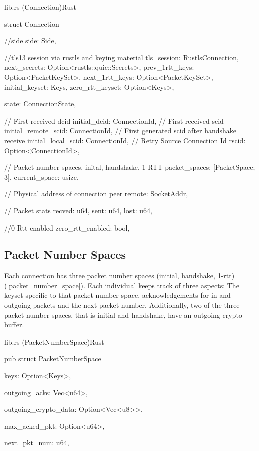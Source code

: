 \begin{codeblock}{lib.rs (Connection)}{Rust}
  \begin{rustcode}
    struct Connection {
        //side
        side: Side,
    
        //tls13 session via rustls and keying material
        tls_session: RustlsConnection,
        next_secrets: Option<rustls::quic::Secrets>,
        prev_1rtt_keys: Option<PacketKeySet>,
        next_1rtt_keys: Option<PacketKeySet>,
        initial_keyset: Keys,
        zero_rtt_keyset: Option<Keys>,
    
        state: ConnectionState,
    
        // First received dcid
        initial_dcid: ConnectionId,
        // First received scid
        initial_remote_scid: ConnectionId,
        // First generated scid after handshake receive
        initial_local_scid: ConnectionId,
        // Retry Source Connection Id
        rscid: Option<ConnectionId>,
    
        // Packet number spaces, inital, handshake, 1-RTT
        packet_spaces: [PacketSpace; 3],
        current_space: usize,
    
        // Physical address of connection peer
        remote: SocketAddr,
    
        // Packet stats
        recved: u64,
        sent: u64,
        lost: u64,
    
        //0-Rtt enabled
        zero_rtt_enabled: bool,
    }
  \end{rustcode}
\end{codeblock}

\subsection{Packet Number Spaces}

Each connection has three packet number spaces (initial, handshake, 1-rtt)(\ref{packet_number_space}). Each individual 
keeps track of three aspects: The keyset specific to that packet number space, acknowledgements for in and outgoing packets and the next packet
number. Additionally, two of the three packet number spaces, that is initial and handshake, have an outgoing crypto buffer. 

\begin{codeblock}{lib.rs (PacketNumberSpace)}{Rust}
  \begin{rustcode}
    pub struct PacketNumberSpace {
        keys: Option<Keys>,
    
        outgoing_acks: Vec<u64>,
    
        outgoing_crypto_data: Option<Vec<u8>>,
    
        max_acked_pkt: Option<u64>,
    
        next_pkt_num: u64,
    }
  \end{rustcode}
  \label{packet_number_space}
\end{codeblock}


